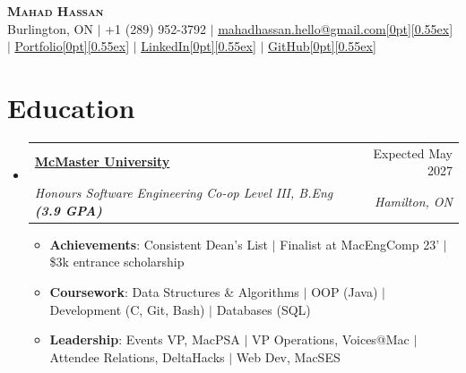 \documentclass[letterpaper,11pt]{article}
\makeatletter
\newcommand{\resumeItem}[1]{\item\small{{#1 \vspace{-2pt}}}}
\newcommand{\resumeSubheading}[4]{
  \vspace{-2pt}\item
  \begin{tabular*}{0.97\textwidth}[t]{l@{\extracolsep{\fill}}r}
    \textbf{#1} & #2 \\
    \textit{\small#3} & \textit{\small#4} \\
  \end{tabular*}\vspace{-7pt}
}
\newcommand{\resumeSubHeadingListStart}{\begin{itemize}[leftmargin=0.15in, label={}]}
\newcommand{\resumeSubHeadingListEnd}{\end{itemize}}
\newcommand{\resumeItemListStart}{\begin{itemize}}
\newcommand{\resumeItemListEnd}{\end{itemize}\vspace{-5pt}}
\makeatother
\begin{document}
\begin{center}
    \textbf{\Huge \scshape Mahad Hassan} \\[2pt]
    \small Burlington, ON $|$ +1 (289) 952-3792 $|$
    \href{mailto:mahadhassan.hello@gmail.com}{\underline{mahadhassan.hello@gmail.com\raisebox{0pt}[0pt][0.55ex]{}}} $|$
    \href{https://www.mahadhssn.com/}{\underline{Portfolio\raisebox{0pt}[0pt][0.55ex]{}}} $|$
    \href{https://www.linkedin.com/in/mahad-hassan/}{\underline{LinkedIn\raisebox{0pt}[0pt][0.55ex]{}}} $|$
    \href{https://github.com/mahadhsn}{\underline{GitHub\raisebox{0pt}[0pt][0.55ex]{}}}
\end{center}

\section{Education}
\resumeSubHeadingListStart
  \resumeSubheading
    {\href{https://www.eng.mcmaster.ca/cas/}{McMaster University \faLink}}{Expected May 2027}
    {Honours Software Engineering Co-op Level III, B.Eng \textbf{(3.9 GPA)}}{Hamilton, ON}
  \resumeItemListStart
    \resumeItem{\textbf{Achievements}: Consistent Dean's List $|$ Finalist at MacEngComp 23’ $|$ \$3k entrance scholarship}
    \resumeItem{\textbf{Coursework}: Data Structures \& Algorithms $|$ OOP (Java) $|$ Development (C, Git, Bash) $|$ Databases (SQL)}
    \resumeItem{\textbf{Leadership}: Events VP, MacPSA $|$ VP Operations, Voices@Mac $|$ Attendee Relations, DeltaHacks $|$ Web Dev, MacSES}
  \resumeItemListEnd
\resumeSubHeadingListEnd

\end{document}
